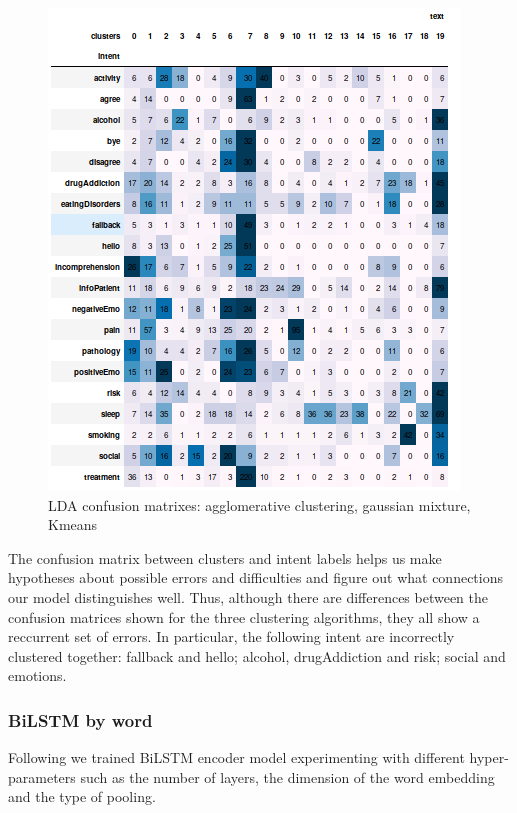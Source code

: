 \documentclass[11pt]{article}
\begin{document}
\begin{figure}[h]
	\includegraphics[scale=0.28]{lda_km_cm.png}
	\caption{LDA confusion matrixes: agglomerative clustering, gaussian mixture, Kmeans}
\label{lda_gm_cm}
\end{figure}
\FloatBarrier

The confusion matrix between clusters and intent labels helps us make
hypotheses about possible errors and difficulties and figure out what
connections our model distinguishes well. Thus, although there are
differences between the confusion matrices shown for the three
clustering algorithms, they all show a reccurrent set of errors. In
particular, the following intent are incorrectly clustered together:
fallback and hello; alcohol, drugAddiction and risk; social and
emotions.

\subsubsection{BiLSTM by word}

Following \cite{P18-1198} we trained BiLSTM encoder model experimenting with different hyper-parameters such as  the number of layers, the dimension of the word embedding and the type of pooling.
\end{document}
